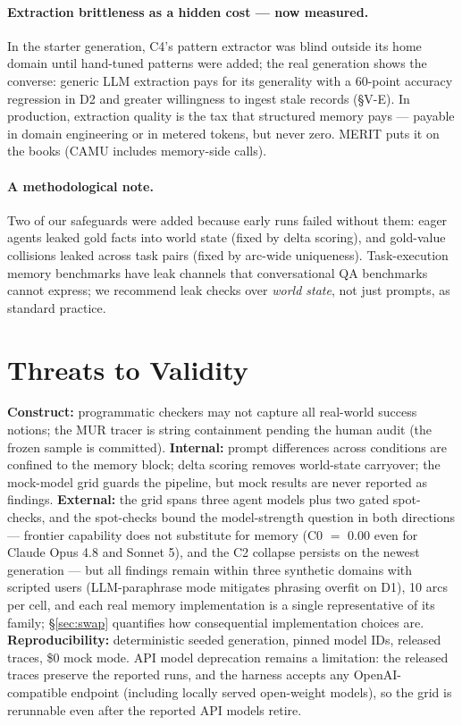 \documentclass[journal]{IEEEtran}
\newcommand{\merit}{\textsc{MERIT}}
\begin{document}
\paragraph{Extraction brittleness as a hidden cost --- now measured.}
In the starter generation, C4's pattern extractor was blind outside its home
domain until hand-tuned patterns were added; the real generation shows the
converse: generic LLM extraction pays for its generality with a 60-point
accuracy regression in D2 and greater willingness to ingest stale records
(\S{}V-E). In production, extraction quality is the tax that structured memory
pays --- payable in domain engineering or in metered tokens, but never zero.
\merit{} puts it on the books (CAMU includes memory-side calls).

\paragraph{A methodological note.}
Two of our safeguards were added because early runs failed without them:
eager agents leaked gold facts into world state (fixed by delta scoring), and
gold-value collisions leaked across task pairs (fixed by arc-wide
uniqueness). Task-execution memory benchmarks have leak channels that
conversational QA benchmarks cannot express; we recommend leak checks over
\emph{world state}, not just prompts, as standard practice.

\section{Threats to Validity}\label{sec:threats}

\textbf{Construct:} programmatic checkers may not capture all real-world
success notions; the MUR tracer is string containment pending the human
audit (the frozen sample is committed). \textbf{Internal:} prompt
differences across conditions are confined to the memory block; delta
scoring removes world-state carryover; the mock-model grid guards the
pipeline, but mock results are never reported as findings.
\textbf{External:} the grid spans three agent models plus two gated
spot-checks, and the spot-checks bound the model-strength question in both
directions --- frontier capability does not substitute for memory (C0
$=$ 0.00 even for Claude Opus 4.8 and Sonnet 5), and the C2 collapse
persists on the newest generation --- but all findings remain within three
synthetic domains with scripted users (LLM-paraphrase mode mitigates
phrasing overfit on D1), 10 arcs per cell, and each real memory
implementation is a single representative of its family;
\S\ref{sec:swap} quantifies how consequential implementation choices are. \textbf{Reproducibility:} deterministic seeded generation,
pinned model IDs, released traces, \$0 mock mode. API model deprecation
remains a limitation: the released traces preserve the reported runs, and
the harness accepts any OpenAI-compatible endpoint (including locally
served open-weight models), so the grid is rerunnable even after the
reported API models retire.
\end{document}
